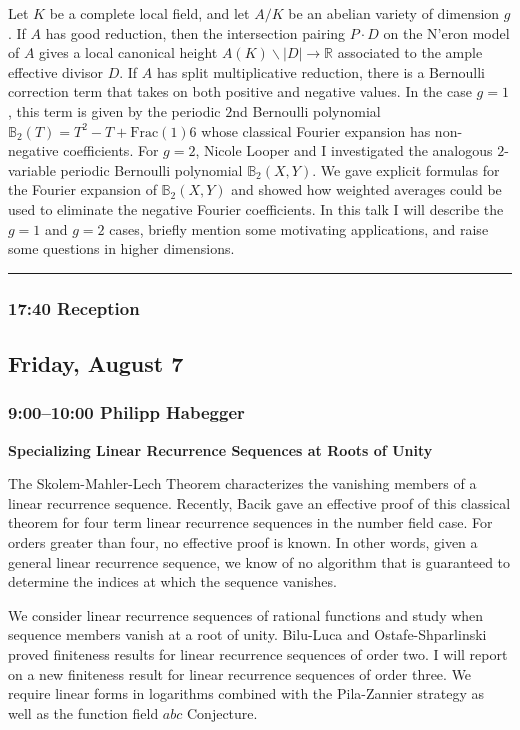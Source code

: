 \documentclass[11pt]{amsart}
\numberwithin{equation}{section}
\providecommand{\frac}[1]{\mathrm{Frac}(#1)}
\begin{document}
Let $K$ be a complete local field, and let $A/K$ be an abelian variety of dimension $g$. If $A$ has good reduction, then the intersection pairing $P\cdot D$ on the N'eron model of $A$ gives a local canonical height $A(K)\smallsetminus|D|\to\mathbb{R}$ associated to the ample effective divisor $D$. If $A$ has split multiplicative reduction, there is a Bernoulli correction term that takes on both positive and negative values. In the case $g=1$, this term is given by the periodic $2$nd Bernoulli polynomial $\mathbb{B}_2(T)=T^2-T+\frac16$ whose classical Fourier expansion has non-negative coefficients. For $g=2$, Nicole Looper and I investigated the analogous $2$-variable periodic Bernoulli polynomial $\mathbb{B}_2(X,Y)$. We gave explicit formulas for the Fourier expansion of $\mathbb{B}_2(X,Y)$ and showed how weighted averages could be used to eliminate the negative Fourier coefficients. In this talk I will describe the $g=1$ and $g=2$ cases, briefly mention some motivating applications, and raise some questions in higher dimensions.

\bigskip
\hrule
\bigskip

\subsubsection*{17:40 \quad Reception}

\newpage

\subsection*{Friday, August 7}

\subsubsection*{9:00--10:00 \quad Philipp Habegger}

\textbf{Specializing Linear Recurrence Sequences at Roots of Unity}

The Skolem-Mahler-Lech Theorem characterizes the vanishing members of a linear recurrence sequence. Recently, Bacik gave an effective proof of this classical theorem for four term linear recurrence sequences in the number field case. For orders greater than four, no effective proof is known. In other words, given a general linear recurrence sequence, we know of no algorithm that is guaranteed to determine the indices at which the sequence vanishes.

We consider linear recurrence sequences of rational functions and study when sequence members vanish at a root of unity. Bilu-Luca and Ostafe-Shparlinski proved finiteness results for linear recurrence sequences of order two. I will report on a new finiteness result for linear recurrence sequences of order three. We require linear forms in logarithms combined with the Pila-Zannier strategy as well as the function field $abc$ Conjecture.
\end{document}
